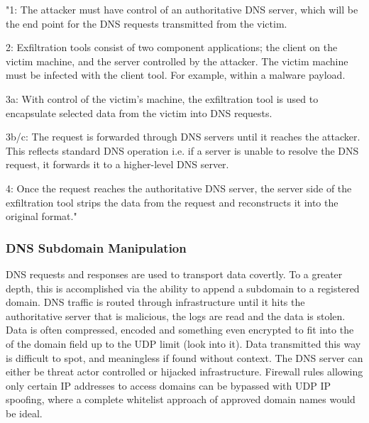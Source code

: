 \begin{displayquote}
\begin{textit}
"1: The attacker must have control of an authoritative DNS
server, which will be the end point for the DNS requests
transmitted from the victim.

2: Exfiltration tools consist of two component applications; the client on the victim machine, and the server
controlled by the attacker. The victim machine must
be infected with the client tool. For example, within a
malware payload.

3a: With control of the victim’s machine, the exfiltration
tool is used to encapsulate selected data from the victim
into DNS requests.

3b/c: The request is forwarded through DNS servers
until it reaches the attacker. This reflects standard DNS
operation i.e. if a server is unable to resolve the DNS
request, it forwards it to a higher-level DNS server.

4: Once the request reaches the authoritative DNS server,
the server side of the exfiltration tool strips the data from
the request and reconstructs it into the original format."
\end{textit}
\end{displayquote}

\vspace*{1in}

\subsubsection{DNS Subdomain Manipulation}

DNS requests and responses are used to transport data covertly. To a greater depth, this is accomplished via the ability to append a subdomain to a registered domain.
DNS traffic is routed through infrastructure until it hits the authoritative server that is malicious, the logs are read and the data is stolen. Data is often compressed, 
encoded and something even encrypted to fit into the of the domain field up to the UDP limit (look into it). \citep{DNSTunneling} Data transmitted this way is difficult to spot, and meaningless 
if found without context. The DNS server can either be threat actor controlled or hijacked infrastructure. Firewall rules allowing only certain IP addresses to access domains can
be bypassed with UDP IP spoofing, where a complete whitelist approach of approved domain names would be ideal. \citep{DNSSpoof&Exfil}


